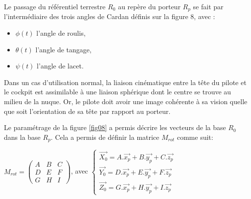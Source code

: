 Le passage du référentiel terrestre $R_0$ au repère du porteur $R_p$ se fait par l'intermédiaire des trois angles de Cardan définis sur la figure 8, avec :
\begin{itemize}
 \item $\phi(t)$ l'angle de roulis,
 \item $\theta(t)$ l'angle de tangage,
 \item $\psi(t)$ l'angle de lacet.
\end{itemize}


\medskip

Dans un cas d'utilisation normal, la liaison cinématique entre la tête du pilote et le cockpit est assimilable à une liaison sphérique dont le centre se trouve au milieu de la nuque. Or, le pilote doit avoir une image cohérente à sa vision quelle que soit l'orientation de sa tête par rapport au porteur.


\medskip

Le paramétrage de la figure \ref{fig08} a permis décrire les vecteurs de la base $R_0$ dans la base $R_p$. Cela a permis de définir la matrice $M_{rot}$ comme suit:

\begin{center}
$M_{rot}=\left(\begin{array}{ccc}
A & B & C\\
D & E & F\\
G & H & I
\end{array}
\right)$, avec $\left\{\begin{array}{l}
\overrightarrow{X_0}=A.\overrightarrow{x_p}+B.\overrightarrow{y_p}+C.\overrightarrow{z_p} \\
\overrightarrow{Y_0}=D.\overrightarrow{x_p}+E.\overrightarrow{y_p}+F.\overrightarrow{z_p} \\
\overrightarrow{Z_0}=G.\overrightarrow{x_p}+H.\overrightarrow{y_p}+I.\overrightarrow{z_p}
\end{array}\right.$
\end{center}


